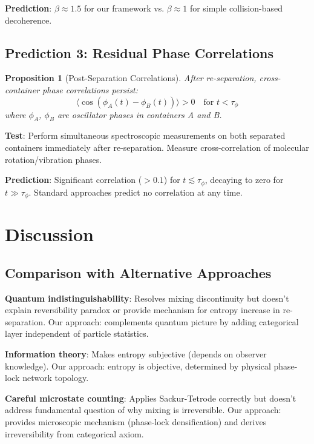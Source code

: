 \documentclass[twocolumn,superscriptaddress,prb,10pt]{revtex4-2}
\newtheorem{proposition}[theorem]{Proposition}
\theoremstyle{definition}
\theoremstyle{remark}
\begin{document}
\textbf{Prediction}: $\beta \approx 1.5$ for our framework vs. $\beta \approx 1$ for simple collision-based decoherence.

\subsection{Prediction 3: Residual Phase Correlations}

\begin{proposition}[Post-Separation Correlations]
After re-separation, cross-container phase correlations persist:
\begin{equation}
\langle \cos(\phi_A(t) - \phi_B(t)) \rangle > 0 \quad \text{for } t < \tau_{\phi}
\end{equation}
where $\phi_A$, $\phi_B$ are oscillator phases in containers A and B.
\end{proposition}

\textbf{Test}: Perform simultaneous spectroscopic measurements on both separated containers immediately after re-separation. Measure cross-correlation of molecular rotation/vibration phases.

\textbf{Prediction}: Significant correlation ($> 0.1$) for $t \lesssim \tau_{\phi}$, decaying to zero for $t \gg \tau_{\phi}$. Standard approaches predict no correlation at any time.

\section{Discussion}

\subsection{Comparison with Alternative Approaches}

\textbf{Quantum indistinguishability}: Resolves mixing discontinuity but doesn't explain reversibility paradox or provide mechanism for entropy increase in re-separation. Our approach: complements quantum picture by adding categorical layer independent of particle statistics.

\textbf{Information theory}: Makes entropy subjective (depends on observer knowledge). Our approach: entropy is objective, determined by physical phase-lock network topology.

\textbf{Careful microstate counting}: Applies Sackur-Tetrode correctly but doesn't address fundamental question of why mixing is irreversible. Our approach: provides microscopic mechanism (phase-lock densification) and derives irreversibility from categorical axiom.
\end{document}

